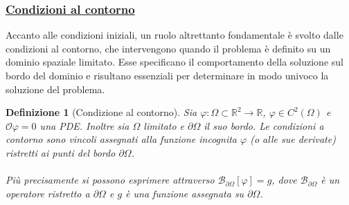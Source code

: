 \documentclass[a4paper,12pt]{report}
\newtheorem{definizione}{Definizione}[chapter]
\begin{document}
\subsubsection{\underline{Condizioni al contorno}}

Accanto alle condizioni iniziali, un ruolo altrettanto fondamentale è svolto dalle condizioni al contorno, che intervengono quando il problema è definito su un dominio spaziale limitato. Esse specificano il comportamento della soluzione sul bordo del dominio e risultano essenziali per determinare in modo univoco la soluzione del problema.

\begin{definizione}[Condizione al contorno]
    Sia $\varphi:\Omega \subset\mathbb{R}^2\to \mathbb{R}$, $\varphi \in C^2(\Omega)$ e $\mathcal{O}\varphi=0$ una PDE. Inoltre sia $\Omega$ limitato e $\partial\Omega$ il suo bordo. Le condizioni a contorno sono vincoli assegnati alla funzione incognita $\varphi$ (o alle sue derivate) ristretti ai punti del bordo $\partial\Omega$. 
    \\ 
    \\Più precisamente si possono esprimere attraverso $\mathcal{B}_{\partial\Omega}[\varphi]=g$, dove $\mathcal{B}_{\partial\Omega}$ è un operatore ristretto a $\partial\Omega$ e $g$ è una funzione assegnata su $\partial\Omega$.
\end{definizione}
\end{document}
